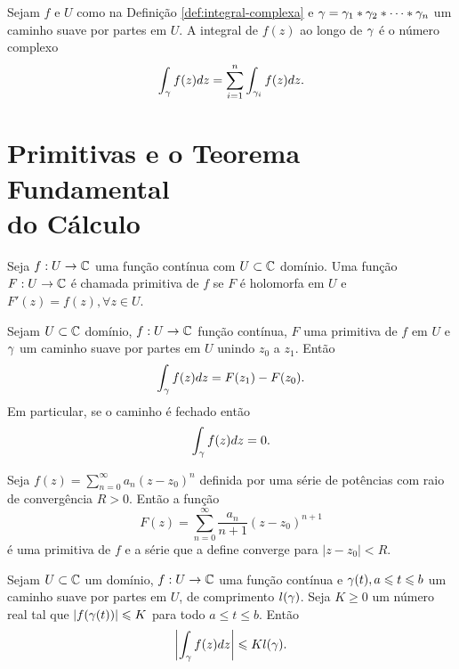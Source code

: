 \begin{definicao}
Sejam $f$ e $U$ como na Definição \ref{def:integral-complexa} e
$\gamma = \gamma_1*\gamma_2*\cdots*\gamma_n$ um caminho suave por partes em $U$.
A integral de $f(z)$ ao longo de $\gamma$ é o número complexo
\begin{equation*}
    \int_{\gamma} f(z)dz = \sum_{i=1}^n\int_{\gamma_i} f(z)dz.
\end{equation*}
\end{definicao}



\section[Primitivas e o Teorema Fundamental do Cálculo]
{Primitivas e o Teorema Fundamental\\ do Cálculo}

\begin{definicao}
\label{def:primitiva-complexa}
Seja $f:U \to \mathbb{C}$ uma função contínua com $U\subset\mathbb{C}$ domínio. Uma função $F:U\to\mathbb{C}$
é chamada primitiva de $f$ se $F$ é holomorfa em $U$ e $F'(z) = f(z), \forall z\in U$.
\end{definicao}

\begin{teorema}

Sejam $U\subset\mathbb{C}$ domínio, $f:U\to\mathbb{C}$ função contínua,
$F$ uma primitiva de $f$ em $U$ e $\gamma$ um caminho suave por partes em $U$ unindo $z_0$ a $z_1$. Então
\begin{equation*}
    \int_{\gamma} f(z)dz = F(z_1) - F(z_0).
\end{equation*}
Em particular, se o caminho é fechado então
\begin{equation*}
    \int_{\gamma} f(z)dz = 0.
\end{equation*}
\end{teorema}

\begin{proposicao}
Seja $\displaystyle{ f(z) = \sum_{n=0}^{\infty} a_n(z-z_0)^n }$
definida por uma série de potências com raio de convergência $R>0$.
Então a função
\begin{equation*}
    F(z) = \sum_{n=0}^{\infty} \frac{a_n}{n+1}(z-z_0)^{n+1}
\end{equation*}
é uma primitiva de $f$ e a série que a define converge para $|z-z_0| < R$.
\end{proposicao}

\begin{lema}
\label{lema-tecnico}
Sejam $U\subset\mathbb{C}$ um domínio, $f:U\to\mathbb{C}$ uma função contínua e
$\gamma(t), a\leqslant t\leqslant b$ um caminho suave por partes em $U$, de comprimento $l(\gamma)$.
Seja $K\geq 0$ um número real tal que $|f(\gamma(t))| \leqslant K$ para todo $a\leq t\leq b$. Então
\begin{equation*}
    \left| \int_{\gamma}f(z)dz \right| \leqslant Kl(\gamma).
\end{equation*}
\end{lema}


